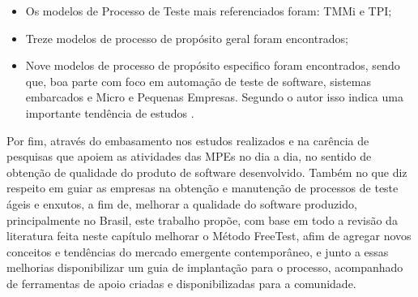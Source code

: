 \begin{itemize}
    \item Os modelos de Processo de Teste mais referenciados foram: TMMi e TPI;
    \item Treze modelos de processo de propósito geral foram encontrados;
    \item Nove modelos de processo de propósito especifico foram encontrados, sendo que, boa parte com foco em automação de teste de software, sistemas embarcados e Micro e Pequenas Empresas. Segundo o autor isso indica uma importante tendência de estudos \cite{Carlo2010}.
\end{itemize}

Por fim, através do embasamento nos estudos realizados e na carência de pesquisas que apoiem as atividades das MPEs no dia a dia, no sentido de obtenção de qualidade do produto de software desenvolvido. Também no que diz respeito em guiar as empresas na obtenção e manutenção de processos de teste ágeis e enxutos, a fim de, melhorar a qualidade do software produzido, principalmente no Brasil, este trabalho propõe, com base em todo a revisão da literatura feita neste capítulo melhorar o Método FreeTest, afim de agregar novos conceitos e tendências do mercado emergente contemporâneo, e junto a essas melhorias disponibilizar um guia de implantação para o processo, acompanhado de ferramentas de apoio criadas e disponibilizadas para a comunidade.